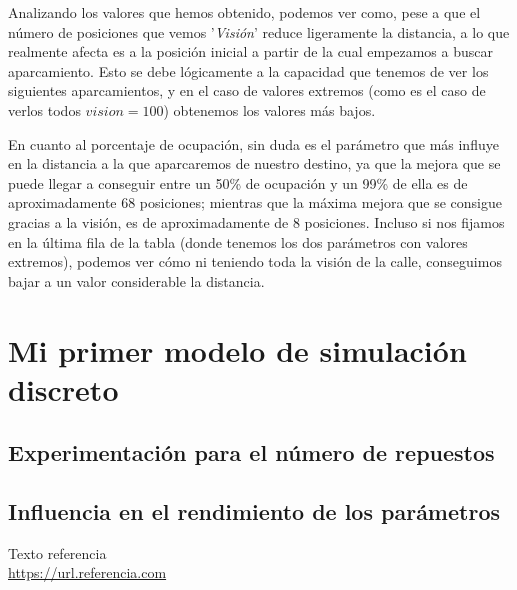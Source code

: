 \documentclass[11pt,a4paper]{report}
\begin{document}
Analizando los valores que hemos obtenido, podemos ver como, pese a que el número de posiciones que vemos '\textit{Visión}' reduce
ligeramente la distancia, a lo que realmente afecta es a la posición inicial a partir de la cual empezamos a buscar aparcamiento.
Esto se debe lógicamente a la capacidad que tenemos de ver los siguientes aparcamientos, y en el caso de valores extremos (como es
el caso de verlos todos $vision=100$) obtenemos los valores más bajos.

En cuanto al porcentaje de ocupación, sin duda es el parámetro que más influye en la distancia a la que aparcaremos de nuestro
destino, ya que la mejora que se puede llegar a conseguir entre un 50\% de ocupación y un 99\% de ella es de aproximadamente 68
posiciones; mientras que la máxima mejora que se consigue gracias a la visión, es de aproximadamente de 8 posiciones. Incluso si
nos fijamos en la última fila de la tabla (donde tenemos los dos parámetros con valores extremos), podemos ver cómo ni teniendo
toda la visión de la calle, conseguimos bajar a un valor considerable la distancia.



\chapter{Mi primer modelo de simulación discreto}

\section{Experimentación para el número de repuestos}

\section{Influencia en el rendimiento de los parámetros}

\newpage

\begin{thebibliography}{5}

Texto referencia
\\\url{https://url.referencia.com}

\end{thebibliography}
\end{document}
